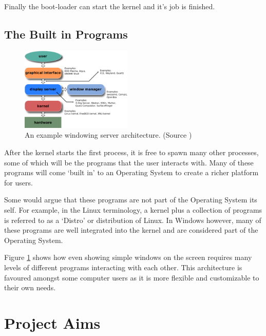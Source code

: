 \documentclass[a4paper]{report}
\begin{document}
Finally the boot-loader can start the kernel and it's job is finished.

\subsection{The Built in Programs}

\begin{figure}
\centering
\includegraphics[width=200px]{images/windowing}
\caption{An example windowing server architecture. (Source \cite{Windowing})}
\label{fig:theserver}
\end{figure}

After the kernel starts the first process, it is free to spawn many other processes, some of which will be the programs that the user interacts with. Many of these programs will come `built in' to an Operating System to create a richer platform for users.

Some would argue that these programs are not part of the Operating System its self. For example, in the Linux terminology, a kernel plus a collection of programs is referred to as a `Distro' or distribution of Linux. In Windows however, many of these programs are well integrated into the kernel and are considered part of the Operating System.

Figure \ref{fig:theserver} shows how even showing simple windows on the screen requires many levels of different programs interacting with each other. This architecture is favoured amongst some computer users as it is more flexible and customizable to their own needs.
















\clearpage
\section {Project Aims}
\end{document}
